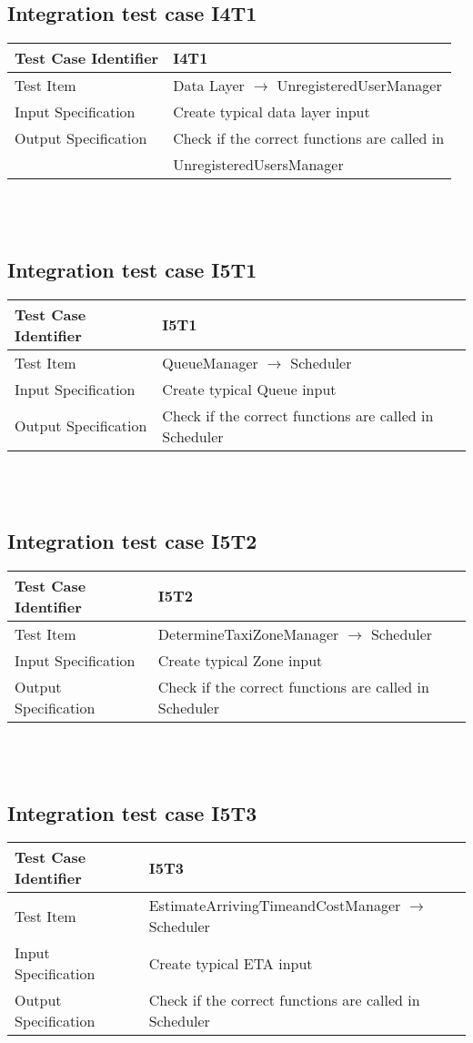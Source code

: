 \documentclass[12pt, oneside]{book}   	%
\begin{document}
\subsection{Integration test case I4T1}
\begin{tabular}{|l|l|}
\hline
Test Case Identifier & I4T1\\
\hline
Test Item & Data Layer $\rightarrow$ UnregisteredUserManager\\
\hline
Input Specification & Create typical data layer input\\
\hline
Output Specification & Check if the correct functions are called in\\
& UnregisteredUsersManager\\
\hline
\end{tabular}
\\
\\
\subsection{Integration test case I5T1}
\begin{tabular}{|l|l|}
\hline
Test Case Identifier & I5T1\\
\hline
Test Item & QueueManager $\rightarrow$ Scheduler\\
\hline
Input Specification & Create typical Queue input\\
\hline
Output Specification & Check if the correct functions are called in Scheduler\\
\hline
\end{tabular}
\\
\\
\subsection{Integration test case I5T2}
\begin{tabular}{|l|l|}
\hline
Test Case Identifier & I5T2\\
\hline
Test Item & DetermineTaxiZoneManager $\rightarrow$ Scheduler\\
\hline
Input Specification & Create typical Zone input\\
\hline
Output Specification & Check if the correct functions are called in Scheduler\\
\hline
\end{tabular}
\\
\\
\subsection{Integration test case I5T3}
\begin{tabular}{|l|l|}
\hline
Test Case Identifier & I5T3\\
\hline
Test Item & EstimateArrivingTimeandCostManager $\rightarrow$ Scheduler\\
\hline
Input Specification & Create typical ETA input\\
\hline
Output Specification & Check if the correct functions are called in Scheduler\\
\hline
\end{tabular}
\\
\\
\end{document}
